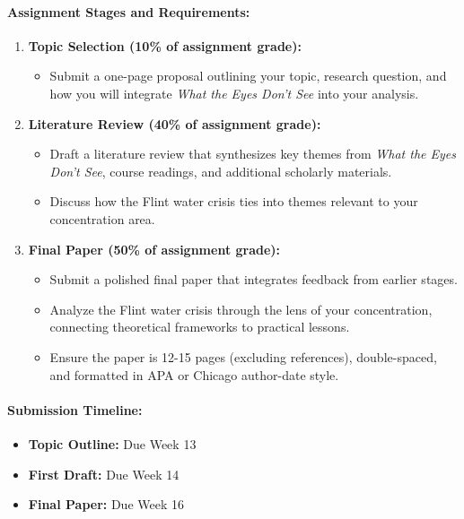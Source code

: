 \documentclass[12pt, letterpaper]{article}
\begin{document}
\paragraph*{Assignment Stages and Requirements:}
\begin{enumerate}
    \item \textbf{Topic Selection (10\% of assignment grade):}
    \begin{itemize}
        \item Submit a one-page proposal outlining your topic, research question, and how you will integrate \textit{What the Eyes Don’t See} into your analysis.
    \end{itemize}
    \item \textbf{Literature Review (40\% of assignment grade):}
    \begin{itemize}
        \item Draft a literature review that synthesizes key themes from \textit{What the Eyes Don’t See}, course readings, and additional scholarly materials.
        \item Discuss how the Flint water crisis ties into themes relevant to your concentration area.
    \end{itemize}
    \item \textbf{Final Paper (50\% of assignment grade):}
    \begin{itemize}
        \item Submit a polished final paper that integrates feedback from earlier stages.
        \item Analyze the Flint water crisis through the lens of your concentration, connecting theoretical frameworks to practical lessons.
        \item Ensure the paper is 12-15 pages (excluding references), double-spaced, and formatted in APA or Chicago author-date style.
    \end{itemize}
\end{enumerate}

\paragraph*{Submission Timeline:}
\begin{itemize}
    \item \textbf{Topic Outline:} Due Week 13
    \item \textbf{First Draft:} Due Week 14
    \item \textbf{Final Paper:} Due Week 16
\end{itemize}
\end{document}

